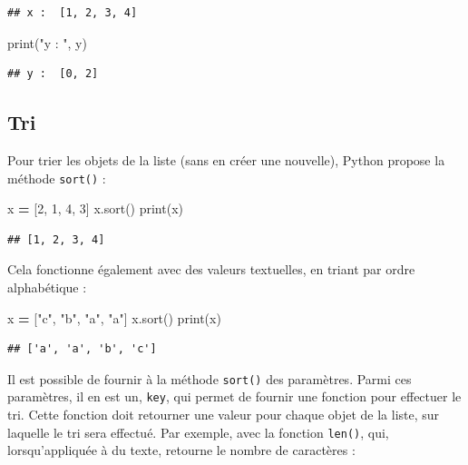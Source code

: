 \documentclass[12pt,]{book}
\newenvironment{Shaded}{\begin{snugshade}}{\end{snugshade}}
\newcommand{\DecValTok}[1]{\textcolor[rgb]{0.00,0.00,0.81}{#1}}
\newcommand{\StringTok}[1]{\textcolor[rgb]{0.31,0.60,0.02}{#1}}
\newcommand{\OperatorTok}[1]{\textcolor[rgb]{0.81,0.36,0.00}{\textbf{#1}}}
\newcommand{\BuiltInTok}[1]{#1}
\newcommand{\NormalTok}[1]{#1}
\numberwithin{equation}{section}
\numberwithin{countremarque}{section}
\begin{document}
\begin{lstlisting}
## x :  [1, 2, 3, 4]
\end{lstlisting}

\begin{Shaded}
\begin{Highlighting}[]
\BuiltInTok{print}\NormalTok{(}\StringTok{"y : "}\NormalTok{, y)}
\end{Highlighting}
\end{Shaded}

\begin{lstlisting}
## y :  [0, 2]
\end{lstlisting}

\subsection{Tri}\label{tri}

Pour trier les objets de la liste (sans en créer une nouvelle), Python
propose la méthode \texttt{sort()} :

\begin{Shaded}
\begin{Highlighting}[]
\NormalTok{x }\OperatorTok{=}\NormalTok{ [}\DecValTok{2}\NormalTok{, }\DecValTok{1}\NormalTok{, }\DecValTok{4}\NormalTok{, }\DecValTok{3}\NormalTok{]}
\NormalTok{x.sort()}
\BuiltInTok{print}\NormalTok{(x)}
\end{Highlighting}
\end{Shaded}

\begin{lstlisting}
## [1, 2, 3, 4]
\end{lstlisting}

Cela fonctionne également avec des valeurs textuelles, en triant par
ordre alphabétique :

\begin{Shaded}
\begin{Highlighting}[]
\NormalTok{x }\OperatorTok{=}\NormalTok{ [}\StringTok{"c"}\NormalTok{, }\StringTok{"b"}\NormalTok{, }\StringTok{"a"}\NormalTok{, }\StringTok{"a"}\NormalTok{]}
\NormalTok{x.sort()}
\BuiltInTok{print}\NormalTok{(x)}
\end{Highlighting}
\end{Shaded}

\begin{lstlisting}
## ['a', 'a', 'b', 'c']
\end{lstlisting}

Il est possible de fournir à la méthode \texttt{sort()} des paramètres.
Parmi ces paramètres, il en est un, \texttt{key}, qui permet de fournir
une fonction pour effectuer le tri. Cette fonction doit retourner une
valeur pour chaque objet de la liste, sur laquelle le tri sera effectué.
Par exemple, avec la fonction \texttt{len()}, qui, lorsqu'appliquée à du
texte, retourne le nombre de caractères :
\end{document}
